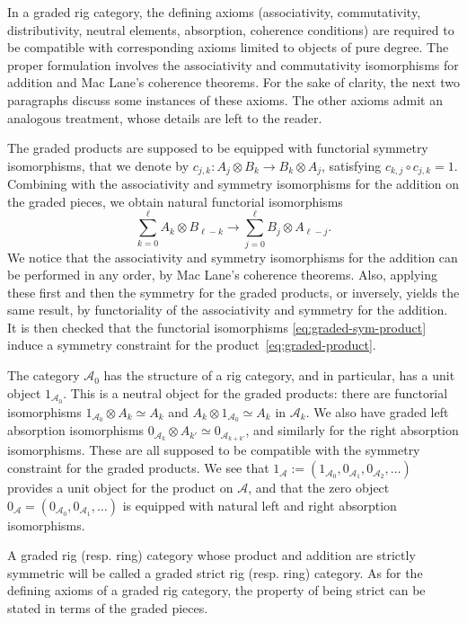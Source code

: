 \documentclass[11pt]{article}
\newcommand{\resp}{resp.\xspace}
\theoremstyle{plain}
\theoremstyle{definition}
\newcommand{\Acal}{\mathcal A}
\begin{document}
In a graded rig category, the defining axioms (associativity, commutativity, distributivity, neutral elements, absorption, coherence conditions) are required to be compatible with corresponding axioms limited to objects of pure degree. The proper formulation involves the associativity and commutativity isomorphisms for addition and Mac Lane's coherence theorems. For the sake of clarity, the next two paragraphs discuss some instances of these axioms. The other axioms admit an analogous treatment, whose details are left to the reader.

The graded products are supposed to be equipped with functorial symmetry isomorphisms, that we denote by $c_{j,k}\colon A_{j}\otimes B_{k}\to B_{k}\otimes A_{j}$, satisfying $c_{k,j}\circ c_{j,k}=1$. Combining with the associativity and symmetry isomorphisms for the addition on the graded pieces, we obtain natural functorial isomorphisms
\begin{equation}\label{eq:graded-sym-product}
\sum_{k=0}^{\ell}A_{k}\otimes B_{\ell-k}\to\sum_{j=0}^{\ell}B_{j}\otimes A_{\ell-j}.
\end{equation}
We notice that the associativity and symmetry isomorphisms for the addition can be performed in any order, by Mac Lane's coherence theorems. Also, applying these first and then the symmetry for the graded products, or inversely, yields the same result, by functoriality of the associativity and symmetry for the addition. It is then checked that the functorial isomorphisms \eqref{eq:graded-sym-product} induce a symmetry constraint for the product~\eqref{eq:graded-product}.

The category $\Acal_{0}$ has the structure of a rig category, and in particular, has a unit object $1_{\Acal_{0}}$. This is a neutral object for the graded products: there are functorial isomorphisms $1_{\Acal_{0}}\otimes A_{k}\simeq A_{k}$ and $A_{k}\otimes 1_{\Acal_{0}}\simeq A_{k}$ in $\Acal_{k}$. We also have graded left absorption isomorphisms $0_{\Acal_{k}}\otimes A_{k'}\simeq 0_{\Acal_{k+k'}}$, and similarly for the right absorption isomorphisms. These are all supposed to be compatible with the symmetry constraint for the graded products. We see that $1_{\Acal}:=(1_{\Acal_{0}},0_{\Acal_{1}},0_{\Acal_{2}},\ldots )$ provides a unit object for the product on $\Acal$, and that the zero object $0_{\Acal}=(0_{\Acal_{0}},0_{\Acal_{1}},\ldots)$ is equipped with natural left and right absorption isomorphisms.

A graded rig (\resp ring) category whose product and addition are strictly symmetric will be called a graded strict rig (\resp ring) category. As for the defining axioms of a graded rig category, the property of being strict can be stated in terms of the graded pieces.
\end{document}
